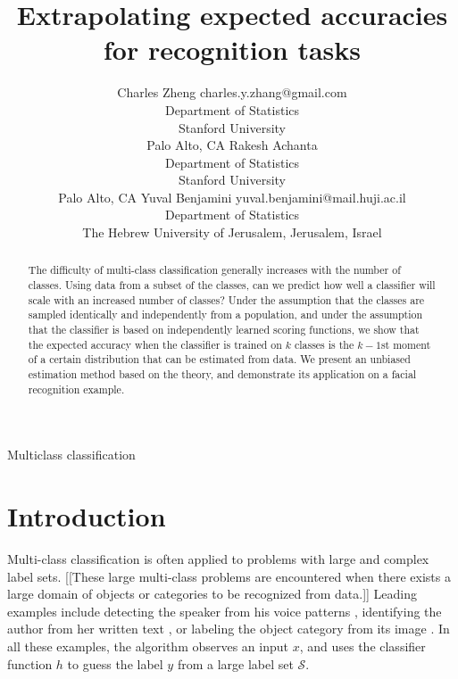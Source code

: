 \documentclass[twoside,11pt]{article}
\begin{document}
\title{Extrapolating expected accuracies for recognition tasks}


\author{\name Charles Zheng \email charles.y.zhang@gmail.com \\
       \addr Department of Statistics\\
       Stanford University\\
       Palo Alto, CA 
       \AND
       \name Rakesh Achanta \email  \\
       \addr Department of Statistics\\
       Stanford University\\
       Palo Alto, CA 
       \AND
       \name Yuval Benjamini \email yuval.benjamini@mail.huji.ac.il \\
       \addr Department of Statistics\\
       The Hebrew University of Jerusalem,
       Jerusalem, Israel}

\maketitle

\begin{abstract}%
The difficulty of multi-class classification generally increases with
the number of classes.  Using data from a subset of the classes, can
we predict how well a classifier will scale with an increased number
of classes?  Under the assumption that the classes are sampled identically and independently from a population, and under the assumption that the classifier is based on independently learned scoring functions, we show that the expected accuracy when the classifier is trained on $k$ classes is the $k-1$st
moment of a certain distribution that can be
estimated from data.  We present an unbiased estimation method based on the theory, and demonstrate its application on a facial recognition example.
\end{abstract}

\begin{keywords}
Multiclass classification
\end{keywords}
\section{Introduction}\label{sec:recog_tasks}

Multi-class classification is often applied to problems with large and complex label sets. 
[[These large multi-class problems are encountered when there exists a large domain of objects or categories to be recognized from data.]]
Leading examples include detecting the speaker from his voice patterns \citep{togneri2011overview}, 
identifying the author from her written text \citep{stamatatos2014overview}, or labeling the object 
category from its image \citep{duygulu2002object,deng2010does,oquab2014learning}. 
In all these examples, 
the algorithm observes an input $x$, and uses the classifier function $h$ to guess the label $y$ from a large label set $\mathcal{S}$. 
\end{document}
